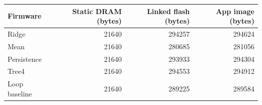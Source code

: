 \begin{tabular}{lrrr}
\toprule Firmware & Static DRAM (bytes) & Linked flash (bytes) & App image (bytes) \\
\midrule
Ridge & 21640 & 294257 & 294624 \\
Mean & 21640 & 280685 & 281056 \\
Persistence & 21640 & 293933 & 294304 \\
Tree4 & 21640 & 294553 & 294912 \\
Loop baseline & 21640 & 289225 & 289584 \\
\bottomrule
\end{tabular}